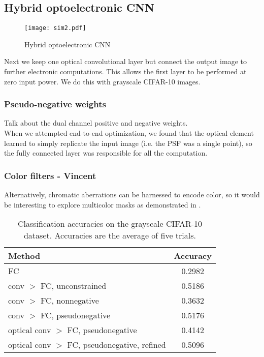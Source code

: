 
\subsection*{Hybrid optoelectronic CNN} 
\begin{figure}[ht]
\centering
\texttt{[image: sim2.pdf]}
\caption{Hybrid optoelectronic CNN}
\label{fig:sim2}
\end{figure}

Next we keep one optical convolutional layer but connect the output image to further electronic computations. This allows the first layer to be performed at zero input power. We do this with grayscale CIFAR-10 images.

\subsubsection*{Pseudo-negative weights}
Talk about the dual channel positive and negative weights. \\
When we attempted end-to-end optimization, we found that the optical element learned to simply replicate the input image (i.e. the PSF was a single point), so the fully connected layer was responsible for all the computation. 

\subsubsection*{Color filters - Vincent}
Alternatively, chromatic aberrations can be harnessed to encode color, so it would be interesting to explore multicolor masks as demonstrated in \cite{shechtman2016multicolour}.

\setlength{\tabcolsep}{4pt}
\begin{table}
\begin{center}
\caption{Classification accuracies on the grayscale CIFAR-10 dataset. Accuracies are the average of five trials.}
\label{table:hybrid}
\begin{tabular}{ l | c} 
 \textbf{Method} &  \textbf{Accuracy} \\ \hline \hline
FC				& 0.2982	\\
conv $>$ FC, unconstrained 	& 0.5186	\\
conv $>$ FC, nonnegative	 & 0.3632	 \\
conv $>$ FC, pseudonegative & 0.5176	\\
optical conv $>$ FC, pseudonegative & 0.4142	\\
optical conv $>$ FC, pseudonegative, refined 	& 0.5096
\end{tabular}
\end{center}
\end{table}
\setlength{\tabcolsep}{1.4pt}


